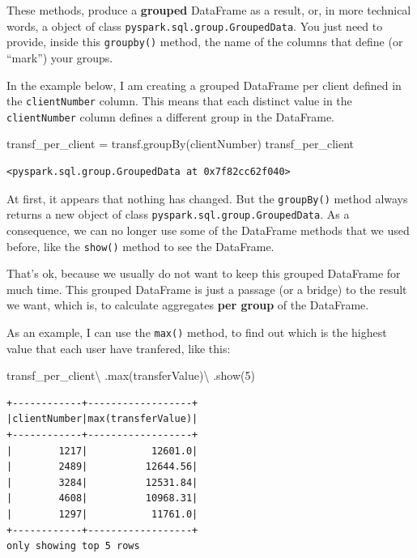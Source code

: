 \documentclass[
  11pt,
  letterpaper,
  DIV=11,
  numbers=noendperiod]{scrreprt}
\newenvironment{Shaded}{\begin{snugshade}}{\end{snugshade}}
\newcommand{\BuiltInTok}[1]{\textcolor[rgb]{0.00,0.23,0.31}{#1}}
\newcommand{\DecValTok}[1]{\textcolor[rgb]{0.68,0.00,0.00}{#1}}
\newcommand{\NormalTok}[1]{\textcolor[rgb]{0.00,0.23,0.31}{#1}}
\newcommand{\OperatorTok}[1]{\textcolor[rgb]{0.37,0.37,0.37}{#1}}
\newcommand{\StringTok}[1]{\textcolor[rgb]{0.13,0.47,0.30}{#1}}
\begin{document}
These methods, produce a \textbf{grouped} DataFrame as a result, or, in
more technical words, a object of class
\texttt{pyspark.sql.group.GroupedData}. You just need to provide, inside
this \texttt{groupby()} method, the name of the columns that define (or
``mark'') your groups.

In the example below, I am creating a grouped DataFrame per client
defined in the \texttt{clientNumber} column. This means that each
distinct value in the \texttt{clientNumber} column defines a different
group in the DataFrame.

\begin{Shaded}
\begin{Highlighting}[]
\NormalTok{transf\_per\_client }\OperatorTok{=}\NormalTok{ transf.groupBy(}\StringTok{\textquotesingle{}clientNumber\textquotesingle{}}\NormalTok{)}
\NormalTok{transf\_per\_client}
\end{Highlighting}
\end{Shaded}

\begin{verbatim}
<pyspark.sql.group.GroupedData at 0x7f82cc62f040>
\end{verbatim}

At first, it appears that nothing has changed. But the
\texttt{groupBy()} method always returns a new object of class
\texttt{pyspark.sql.group.GroupedData}. As a consequence, we can no
longer use some of the DataFrame methods that we used before, like the
\texttt{show()} method to see the DataFrame.

That's ok, because we usually do not want to keep this grouped DataFrame
for much time. This grouped DataFrame is just a passage (or a bridge) to
the result we want, which is, to calculate aggregates \textbf{per group}
of the DataFrame.

As an example, I can use the \texttt{max()} method, to find out which is
the highest value that each user have tranfered, like this:

\begin{Shaded}
\begin{Highlighting}[]
\NormalTok{transf\_per\_client}\OperatorTok{\textbackslash{}}
\NormalTok{  .}\BuiltInTok{max}\NormalTok{(}\StringTok{\textquotesingle{}transferValue\textquotesingle{}}\NormalTok{)}\OperatorTok{\textbackslash{}}
\NormalTok{  .show(}\DecValTok{5}\NormalTok{)}
\end{Highlighting}
\end{Shaded}

\begin{verbatim}
+------------+------------------+
|clientNumber|max(transferValue)|
+------------+------------------+
|        1217|           12601.0|
|        2489|          12644.56|
|        3284|          12531.84|
|        4608|          10968.31|
|        1297|           11761.0|
+------------+------------------+
only showing top 5 rows
\end{verbatim}
\end{document}
